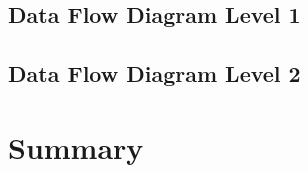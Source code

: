 \subsection[Data Flow Diagram Level 1]{\textbf{Data Flow Diagram Level 1}}


\subsection[Data Flow Diagram Level 2]{\textbf{Data Flow Diagram Level 2}}


\section*{Summary}
